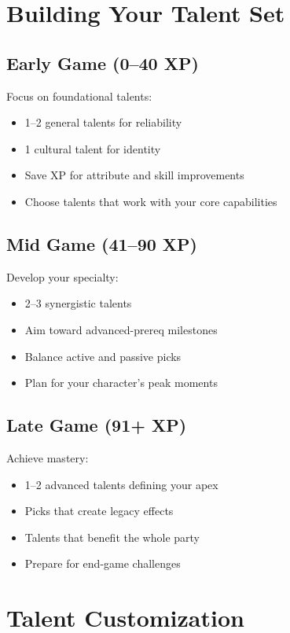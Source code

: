 \section{Building Your Talent Set}

\subsection*{Early Game (0--40 XP)}
Focus on foundational talents:
\begin{itemize}
\item 1--2 general talents for reliability
\item 1 cultural talent for identity
\item Save XP for attribute and skill improvements
\item Choose talents that work with your core capabilities
\end{itemize}

\subsection*{Mid Game (41--90 XP)}
Develop your specialty:
\begin{itemize}
\item 2--3 synergistic talents
\item Aim toward advanced-prereq milestones
\item Balance active and passive picks
\item Plan for your character's peak moments
\end{itemize}

\subsection*{Late Game (91+ XP)}
Achieve mastery:
\begin{itemize}
\item 1--2 advanced talents defining your apex
\item Picks that create legacy effects
\item Talents that benefit the whole party
\item Prepare for end-game challenges
\end{itemize}

\section{Talent Customization}

